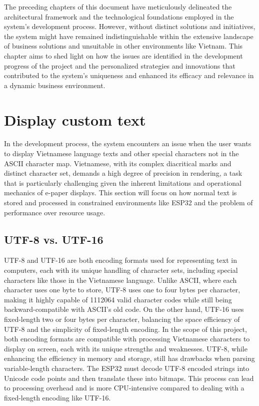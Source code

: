 \documentclass[../Main.tex]{subfiles}
\begin{document}
The preceding chapters of this document have meticulously delineated the architectural framework and the technological foundations employed in the system's development process. However, without distinct solutions and initiatives, the system might have remained indistinguishable within the extensive landscape of business solutions and unsuitable in other environments like Vietnam. This chapter aims to shed light on how the issues are identified in the development progress of the project and the personalized strategies and innovations that contributed to the system's uniqueness and enhanced its efficacy and relevance in a dynamic business environment.

\section{Display custom text}
In the development process, the system encounters an issue when the user wants to display Vietnamese language texts and other special characters not in the ASCII character map. Vietnamese, with its complex diacritical marks and distinct character set, demands a high degree of precision in rendering, a task that is particularly challenging given the inherent limitations and operational mechanics of e-paper displays. This section will focus on how normal text is stored and processed in constrained environments like ESP32 and the problem of performance over resource usage. 

\subsection{UTF-8 vs. UTF-16}
\label{encoding}
UTF-8 and UTF-16 are both encoding formats used for representing text in computers, each with its unique handling of character sets, including special characters like those in the Vietnamese language. Unlike ASCII, where each character uses one byte to store, UTF-8 uses one to four bytes per character, making it highly capable of 1112064 valid character codes while still being backward-compatible with ASCII's old code. On the other hand, UTF-16 uses fixed-length two or four bytes per character, balancing the space efficiency of UTF-8 and the simplicity of fixed-length encoding. In the scope of this project, both encoding formats are compatible with processing Vietnamese characters to display on screen, each with its unique strengths and weaknesses. UTF-8, while enhancing the efficiency in memory and storage, still has drawbacks when parsing variable-length characters. The ESP32 must decode UTF-8 encoded strings into Unicode code points and then translate these into bitmaps. This process can lead to processing overhead and is more CPU-intensive compared to dealing with a fixed-length encoding like UTF-16.
\end{document}
